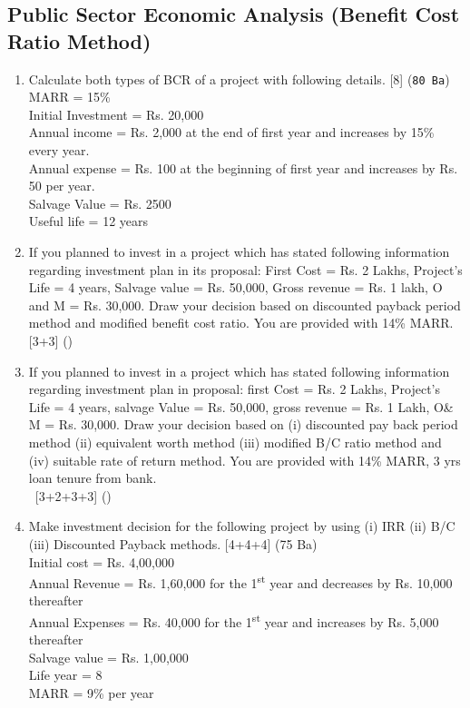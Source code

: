 \documentclass[12pt]{article}
\newcommand{\enter}{\\\textcolor{white}{1}}
\newcommand{\super}[1]{\textsuperscript{#1}}
\begin{document}
	\subsection{Public Sector Economic Analysis (Benefit Cost Ratio Method)}
	\begin{enumerate}[noitemsep, topsep = 0pt]
		\item Calculate both types of BCR of a project with following details. \hfill [8] (\texttt{80 Ba})\\
		MARR = 15\%\\
		Initial Investment = Rs. 20,000\\
		Annual income = Rs. 2,000 at the end of first year and increases by 15\% every year.\\
		Annual expense = Rs. 100 at the beginning of first year and increases by Rs. 50 per year.\\
		Salvage Value = Rs. 2500\\
		Useful life = 12 years
		
		\item If you planned to invest in a project which has stated following information regarding investment plan in its proposal: First Cost = Rs. 2 Lakhs, Project's Life = 4 years, Salvage value = Rs. 50,000, Gross revenue = Rs. 1 lakh, O and M = Rs. 30,000. Draw your decision based on discounted payback period method and modified benefit cost ratio. You are provided with 14\% MARR. \hfill [3+3] ()
		
		\item If you planned to invest in a project which has stated following information regarding investment plan in proposal: first Cost = Rs. 2 Lakhs, Project's Life = 4 years, salvage Value = Rs. 50,000, gross revenue = Rs. 1 Lakh, O\& M = Rs. 30,000. Draw your decision based on (i) discounted pay back period method (ii) equivalent worth method (iii) modified B/C ratio method and (iv) suitable rate of return method. You are provided with 14\% MARR, 3 yrs loan tenure from bank. 
		\enter\hfill [3+2+3+3] ()
		
		\item Make investment decision for the following project by using (i) IRR (ii) B/C (iii) Discounted Payback methods. \hfill [4+4+4] (75 Ba)\\
		Initial cost = Rs. 4,00,000\\
		Annual Revenue = Rs. 1,60,000 for the 1\super{st} year and decreases by Rs. 10,000 thereafter\\
		Annual Expenses = Rs. 40,000 for the 1\super{st} year and increases by Rs. 5,000 thereafter\\
		Salvage value = Rs. 1,00,000\\
		Life year = 8\\
		MARR = 9\% per year
		

\end{enumerate}
\end{document}
